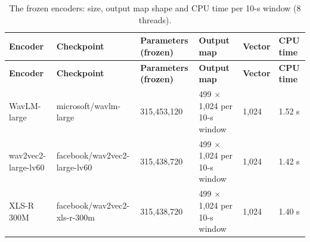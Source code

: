 \documentclass[11pt,a4paper]{article}
\begin{document}
\begin{center}\small\renewcommand{\arraystretch}{1.15}
\begin{longtable}{>{\raggedright\arraybackslash}p{2.58cm}>{\raggedright\arraybackslash}p{3.97cm}>{\raggedleft\arraybackslash}p{1.55cm}>{\raggedright\arraybackslash}p{2.78cm}>{\raggedleft\arraybackslash}p{1.55cm}>{\raggedleft\arraybackslash}p{1.55cm}}
\caption{The frozen encoders: size, output map shape and CPU time per 10-s window (8 threads).}\\
\toprule
\textbf{\hspace{0pt}Encoder} & \textbf{\hspace{0pt}Checkpoint} & \textbf{\hspace{0pt}Parameters (frozen)} & \textbf{\hspace{0pt}Output map} & \textbf{\hspace{0pt}Vector} & \textbf{\hspace{0pt}CPU time}\\\midrule\endfirsthead
\toprule
\textbf{\hspace{0pt}Encoder} & \textbf{\hspace{0pt}Checkpoint} & \textbf{\hspace{0pt}Parameters (frozen)} & \textbf{\hspace{0pt}Output map} & \textbf{\hspace{0pt}Vector} & \textbf{\hspace{0pt}CPU time}\\\midrule\endhead
\bottomrule\endfoot
\hspace{0pt}WavLM-large & \hspace{0pt}microsoft/\allowbreak{}wavlm-large & \hspace{0pt}315,453,120 & \hspace{0pt}499 $\times$ 1,024 per 10-s window & \hspace{0pt}1,024 & \hspace{0pt}1.52 s\\
\hspace{0pt}wav2vec2-large-lv60 & \hspace{0pt}facebook/\allowbreak{}wav2vec2-large-lv60 & \hspace{0pt}315,438,720 & \hspace{0pt}499 $\times$ 1,024 per 10-s window & \hspace{0pt}1,024 & \hspace{0pt}1.42 s\\
\hspace{0pt}XLS-R 300M & \hspace{0pt}facebook/\allowbreak{}wav2vec2-xls-r-300m & \hspace{0pt}315,438,720 & \hspace{0pt}499 $\times$ 1,024 per 10-s window & \hspace{0pt}1,024 & \hspace{0pt}1.40 s\\
\end{longtable}\end{center}
\end{document}
